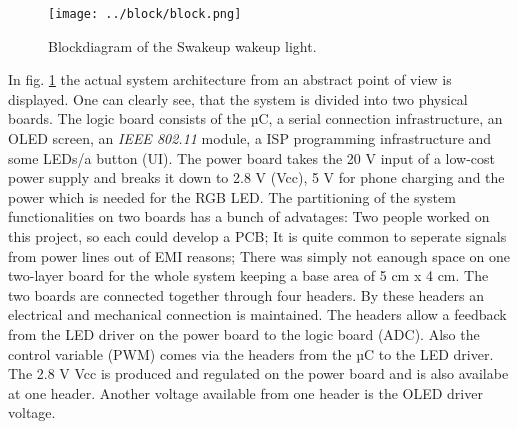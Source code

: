 \begin{figure}[H]
        \centering
        \label{fig:block}
        \texttt{[image: ../block/block.png]}
        \caption{Blockdiagram of the Swakeup wakeup light.}
\end{figure}
In fig. \ref{fig:block} the actual system architecture from an abstract point of view is displayed. One can clearly see, that the system is divided into two physical boards. The logic board consists of the µC, a serial connection infrastructure, an OLED screen, an \textit{IEEE 802.11} module, a ISP programming infrastructure and some LEDs/a button (UI).
\newpar  
The power board takes the 20 V input of a low-cost power supply and breaks it down to 2.8 V (Vcc), 5 V for phone charging and the power which is needed for the RGB LED.
\newpar
The partitioning of the system functionalities on two boards has a bunch of advatages: Two people worked on this project, so each could develop a PCB; It is quite common to seperate signals from power lines out of EMI reasons; There was simply not eanough space on one two-layer board for the whole system keeping a base area of 5 cm x 4 cm. 
\newpar
The two boards are connected together through four headers. By these headers an electrical and mechanical connection is maintained. The headers allow a feedback from the LED driver on the power board to the logic board (ADC). Also the control variable (PWM) comes via the headers from the µC to the LED driver. The 2.8 V Vcc is produced and regulated on the power board and is also availabe at one header. Another voltage available from one header is the OLED driver voltage.       
